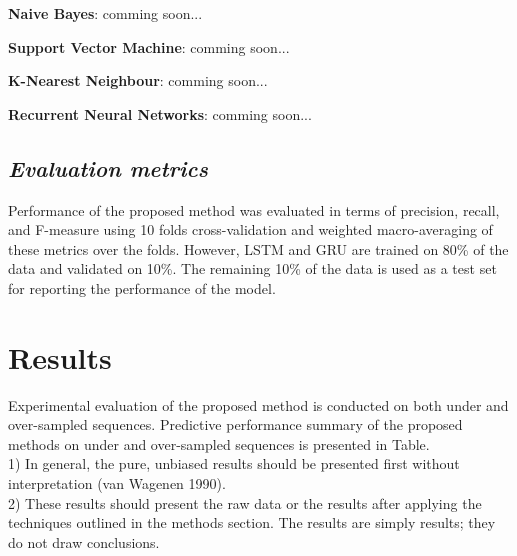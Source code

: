 \documentclass{amia}
\begin{document}
\textbf{Naive Bayes}: comming soon...

\textbf{Support Vector Machine}: comming soon...

\textbf{K-Nearest Neighbour}: comming soon...

\textbf{Recurrent Neural Networks}: comming soon...
  
\subsection*{\textit{Evaluation metrics}}
Performance of the proposed method was evaluated in terms of precision, recall, and F-measure using 10 folds cross-validation and weighted macro-averaging of these metrics over the folds. However, LSTM and GRU are trained on 80\% of the data and validated on 10\%. The remaining 10\% of the data is used as a test set for reporting the performance of the model. 

\section*{Results}
Experimental evaluation of the proposed method is conducted on both under and over-sampled sequences. Predictive performance summary of the proposed methods on under and over-sampled sequences is presented in Table.\\

1) In general, the pure, unbiased results should be presented first without interpretation (van Wagenen 1990). \\
2) These results should present the raw data
or the results after applying the techniques outlined in the methods section. The results are simply results; they do not draw conclusions.
\end{document}
